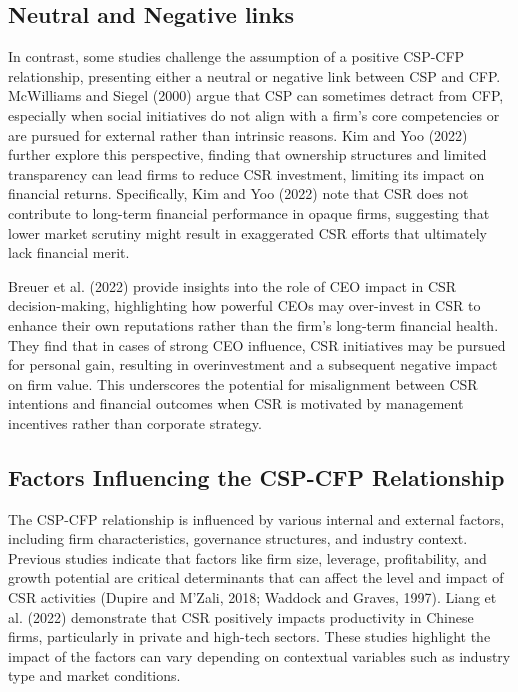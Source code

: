 \documentclass[
  letterpaper,
  DIV=11,
  numbers=noendperiod]{scrartcl}
\begin{document}
\subsection{Neutral and Negative
links}\label{neutral-and-negative-links}

In contrast, some studies challenge the assumption of a positive CSP-CFP
relationship, presenting either a neutral or negative link between CSP
and CFP. McWilliams and Siegel (2000) argue that CSP can sometimes
detract from CFP, especially when social initiatives do not align with a
firm's core competencies or are pursued for external rather than
intrinsic reasons. Kim and Yoo (2022) further explore this perspective,
finding that ownership structures and limited transparency can lead
firms to reduce CSR investment, limiting its impact on financial
returns. Specifically, Kim and Yoo (2022) note that CSR does not
contribute to long-term financial performance in opaque firms,
suggesting that lower market scrutiny might result in exaggerated CSR
efforts that ultimately lack financial merit.

Breuer et al. (2022) provide insights into the role of CEO impact in CSR
decision-making, highlighting how powerful CEOs may over-invest in CSR
to enhance their own reputations rather than the firm's long-term
financial health. They find that in cases of strong CEO influence, CSR
initiatives may be pursued for personal gain, resulting in
overinvestment and a subsequent negative impact on firm value. This
underscores the potential for misalignment between CSR intentions and
financial outcomes when CSR is motivated by management incentives rather
than corporate strategy.

\subsection{Factors Influencing the CSP-CFP
Relationship}\label{factors-influencing-the-csp-cfp-relationship}

The CSP-CFP relationship is influenced by various internal and external
factors, including firm characteristics, governance structures, and
industry context. Previous studies indicate that factors like firm size,
leverage, profitability, and growth potential are critical determinants
that can affect the level and impact of CSR activities (Dupire and
M'Zali, 2018; Waddock and Graves, 1997). Liang et al. (2022) demonstrate
that CSR positively impacts productivity in Chinese firms, particularly
in private and high-tech sectors. These studies highlight the impact of
the factors can vary depending on contextual variables such as industry
type and market conditions.
\end{document}
